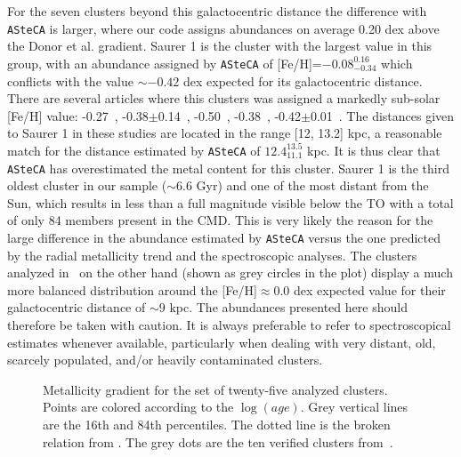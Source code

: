\documentclass{aa}
\begin{document}
  For the seven clusters beyond this galactocentric distance the
  difference with \texttt{ASteCA} is larger, where our code assigns abundances
  on average 0.20 dex above the Donor et al. gradient.
  Saurer 1 is the cluster with the largest value in this group, with
  an abundance assigned by \texttt{ASteCA} of [Fe/H]=$-0.08_{-0.34}^{0.16}$
  which conflicts with the value $\sim-0.42$ dex expected for its
  galactocentric distance.
  There are several articles where this clusters was assigned a 
  markedly sub-solar [Fe/H] value: -0.27~\citep{Carraro_2003},
  -0.38$\pm$0.14~\citep{Carraro_2004},
  -0.50~\citep{Frinchaboy_2004b}, -0.38~\citep{Frinchaboy_2006},
  -0.42$\pm$0.01~\citep{Donor_2020}. The distances given to Saurer 1 in these
  studies are located in the range [12, 13.2] kpc, a reasonable match
  for the distance estimated by \texttt{ASteCA} of $12.4_{11.1}^{13.5}$ kpc. It
  is thus clear that \texttt{ASteCA} has overestimated the metal
  content for this cluster. Saurer 1 is the third oldest cluster in our sample 
  ($\sim6.6$ Gyr) and one of the most distant from the Sun, which results in
  less than a  full magnitude visible below the TO with a total of only 84
  members present in the CMD. This is very likely the reason
  for the large difference in the abundance estimated by \texttt{ASteCA}
  versus the one predicted by the radial metallicity trend and the
  spectroscopic analyses.
  The clusters analyzed in~\cite{Perren_2020} on the other hand (shown as grey
  circles in the plot) display a much more balanced distribution around the 
  [Fe/H]$\approx0.0$ dex expected value for their galactocentric distance of
  $\sim9$ kpc.
  The abundances presented here should therefore be taken with
  caution. It is always preferable to refer to spectroscopical estimates
  whenever available, particularly when dealing with very distant, old,
  scarcely populated, and/or heavily contaminated clusters.\\


  \begin{figure}
   \caption{Metallicity gradient for the set of twenty-five analyzed clusters.
   Points are colored according to the $\log(age)$. Grey vertical lines are the
   16th and 84th percentiles. The dotted line is the broken relation from 
   \citet[][Fig 7]{Donor_2020}. The grey dots are the ten verified clusters
   from~\cite{Perren_2020}.}
   \label{fig:met_gradient}
  \end{figure}
\end{document}
